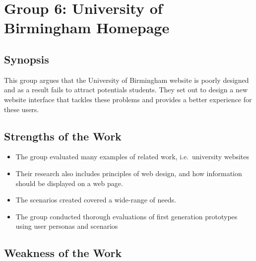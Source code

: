 \section{Group 6: University of Birmingham Homepage}

\subsection{Synopsis}

This group argues that the University of Birmingham website is poorly designed
and as a result fails to attract potentials students. They set out to design a
new website interface that tackles these problems and provides a better
experience for these users.

\subsection{Strengths of the Work}

\begin{itemize}

	\item  The group evaluated many examples of related work, i.e.\ university
	websites

	\item Their research also includes principles of web design, and how
	information should be displayed on a web page.

	\item The scenarios created covered a wide-range of needs.

	\item The group conducted thorough evaluations of first generation
	prototypes using user personas and scenarios

\end{itemize}

\subsection{Weakness of the Work}

